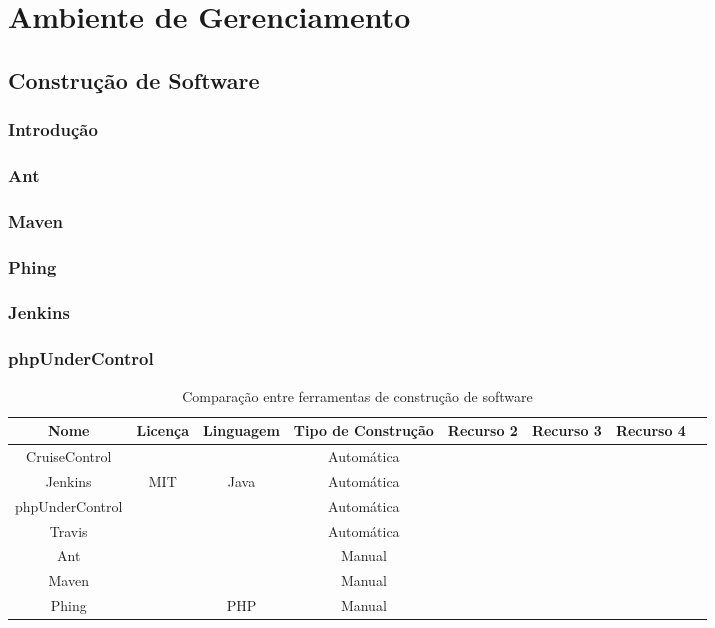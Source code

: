 \documentclass[12pt,a4paper]{article}
\begin{document}
				

\clearpage		
\section{Ambiente de Gerenciamento}
	\subsection{Construção de Software}
		\subsubsection{Introdução}
		\subsubsection{Ant}
		\subsubsection{Maven}
		\subsubsection{Phing}
		\subsubsection{Jenkins}
		\subsubsection{phpUnderControl}
		
		\begin{table}[h]
			\tabcolsep=0.11cm
			\begin{tabular}{|c|c|c|c|c|c|c|c|}
			\hline Nome 			& Licença 	& Linguagem & Tipo de Construção 	& Recurso 2 & Recurso 3 & Recurso 4  \\
			\hline  CruiseControl	&  			&  			& Automática			&  			&  			&  			\\
			\hline  Jenkins			& MIT		& Java		& Automática			&  			&  			&  			\\
			\hline  phpUnderControl	&  			&  			& Automática 			&  			&  			&  			\\ 
			\hline  Travis			&  			&  			& Automática			&  			&  			&  			\\ 
			\hline  Ant				&  			&  			& Manual				&  			&  			&  			\\ 
			\hline  Maven			&  			&  			& Manual				&  			&  			&  			\\ 
			\hline  Phing			&  			& PHP		& Manual				&  			&  			&  			\\
			\hline  
			\end{tabular} 
			\caption{Comparação entre ferramentas de construção de software}
		\end{table}
		
\end{document}
